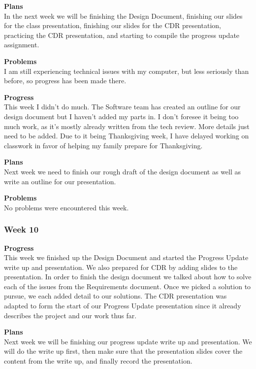 \textbf{Plans} \\ 
In the next week we will be finishing the Design Document, finishing our slides for the class presentation, finishing our slides for the CDR presentation, practicing the CDR presentation, and starting to compile the progress update assignment.

\textbf{Problems} \\ 
I am still experiencing technical issues with my computer, but less seriously than before, so progress has been made there.

\textbf{Progress} \\
This week I didn't do much. The Software team has created an outline for our design document but I haven't added my parts in. I don't foresee it being too much work, as it's mostly already written from the tech review. More details just need to be added. Due to it being Thanksgiving week, I have delayed working on classwork in favor of helping my family prepare for Thanksgiving.

\textbf{Plans} \\
Next week we need to finish our rough draft of the design document as well as write an outline for our presentation.

\textbf{Problems} \\
No problems were encountered this week.

\subsubsection{Week 10}
\textbf{Progress} \\ 
This week we finished up the Design Document and started the Progress Update write up and presentation. We also prepared for CDR by adding slides to the presentation. In order to finish the design document we talked about how to solve each of the issues from the Requirements document. Once we picked a solution to pursue, we each added detail to our solutions. The CDR presentation was adapted to form the start of our Progress Update presentation since it already describes the project and our work thus far.

\textbf{Plans} \\ 
Next week we will be finishing our progress update write up and presentation. We will do the write up first, then make sure that the presentation slides cover the content from the write up, and finally record the presentation.

